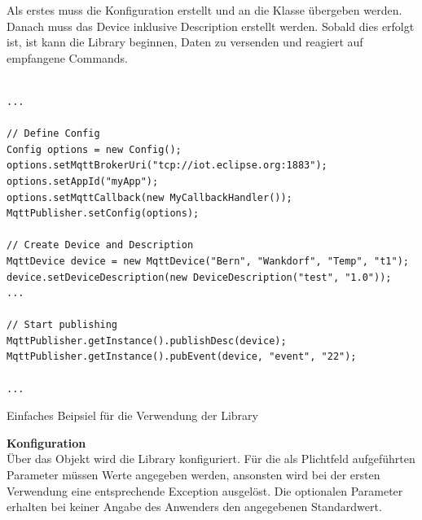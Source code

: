 Als erstes muss die Konfiguration erstellt und an die Klasse  übergeben werden. Danach muss das Device inklusive Description erstellt werden. Sobald dies erfolgt ist, ist kann die Library beginnen, Daten zu versenden und reagiert auf empfangene Commands.

\begin{listing}[H]
\begin{verbatim}

...

// Define Config
Config options = new Config();
options.setMqttBrokerUri("tcp://iot.eclipse.org:1883");
options.setAppId("myApp");
options.setMqttCallback(new MyCallbackHandler());
MqttPublisher.setConfig(options);
	
// Create Device and Description	
MqttDevice device = new MqttDevice("Bern", "Wankdorf", "Temp", "t1");	
device.setDeviceDescription(new DeviceDescription("test", "1.0"));
...

// Start publishing
MqttPublisher.getInstance().publishDesc(device);
MqttPublisher.getInstance().pubEvent(device, "event", "22");

...

\end{verbatim}
\caption{Einfaches Beipsiel für die Verwendung der Library}
\end{listing}

\textbf{Konfiguration} \\
Über das  Objekt wird die Library konfiguriert. Für die als Plichtfeld aufgeführten Parameter müssen Werte angegeben werden, ansonsten wird bei der ersten Verwendung eine entsprechende Exception ausgelöst. Die optionalen Parameter erhalten bei keiner Angabe des Anwenders den angegebenen Standardwert.


